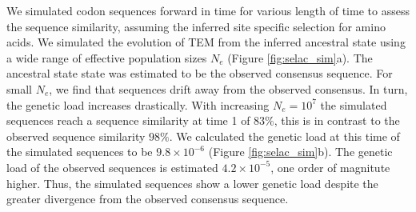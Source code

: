 \documentclass[12pt]{article}
\begin{document}
We simulated codon sequences forward in time for various length of time to assess the sequence similarity, assuming the \selac inferred site specific selection for amino acids.
We simulated the evolution of TEM from the inferred ancestral state using a wide range of effective population sizes $N_e$ (Figure \ref{fig:selac_sim}a).
The ancestral state state was estimated to be the observed consensus sequence.
For small $N_e$, we find that sequences drift away from the observed consensus. 
In turn, the genetic load increases drastically.
With increasing $N_e = 10^7$ the simulated sequences reach a sequence similarity at time 1 of $83 \%$, this is in contrast to the observed sequence similarity $98 \%$.
We calculated the genetic load at this time of the simulated sequences to be $9.8\times10^{-6}$ (Figure \ref{fig:selac_sim}b).
The genetic load of the observed sequences is estimated $4.2\times 10^{-5}$, one order of magnitute higher.
Thus, the simulated sequences show a lower genetic load despite the greater divergence from the observed consensus sequence.
\end{document}
